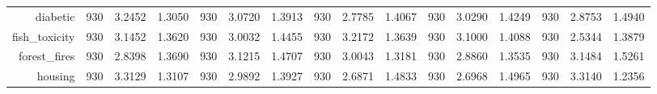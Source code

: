 \begin{table}[htbp]
{\begin{tabular}{rccccccccccccccc}
			diabetic                            & 930                                     & 3.2452                                                                    & 1.3050          & 930                            & 3.0720                                                                    & 1.3913          & 930                             & \cellcolor[rgb]{ .776,  .937,  .808}\textcolor[rgb]{ 0,  .38,  0}{2.7785}          & 1.4067          & 930                             & 3.0290                                                                    & 1.4249          & 930                             & 2.8753                                                                    & 1.4940          \\
			fish\_toxicity                      & 930                                     & 3.1452                                                                    & 1.3620          & 930                            & 3.0032                                                                    & 1.4455          & 930                             & 3.2172                                                                             & 1.3639          & 930                             & 3.1000                                                                    & 1.4088          & 930                             & \cellcolor[rgb]{ .776,  .937,  .808}\textcolor[rgb]{ 0,  .38,  0}{2.5344} & 1.3879          \\
			forest\_fires                       & 930                                     & \cellcolor[rgb]{ .776,  .937,  .808}\textcolor[rgb]{ 0,  .38,  0}{2.8398} & 1.3690          & 930                            & 3.1215                                                                    & 1.4707          & 930                             & 3.0043                                                                             & 1.3181          & 930                             & 2.8860                                                                    & 1.3535          & 930                             & 3.1484                                                                    & 1.5261          \\
			housing                             & 930                                     & 3.3129                                                                    & 1.3107          & 930                            & 2.9892                                                                    & 1.3927          & 930                             & \cellcolor[rgb]{ .776,  .937,  .808}\textcolor[rgb]{ 0,  .38,  0}{2.6871}          & 1.4833          & 930                             & 2.6968                                                                    & 1.4965          & 930                             & 3.3140                                                                    & 1.2356          \\

\end{tabular}}
\end{table}
